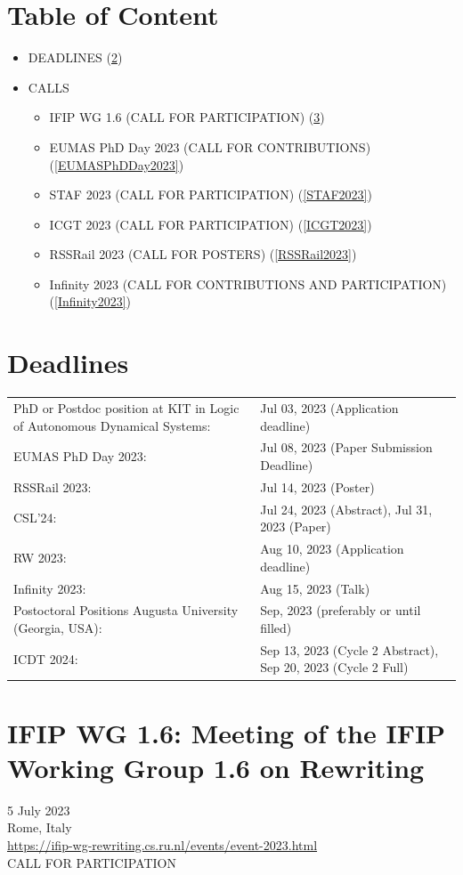 \documentclass[prodmode,acmtecs]{acmsmall} %
\begin{document}
\section{Table of Content}\begin{itemize}\item DEADLINES (\cref{deadlines}) 
 
\item CALLS 
 
\begin{itemize}\item IFIP WG 1.6 (CALL FOR PARTICIPATION) (\cref{IFIPWG16})
\item EUMAS PhD Day 2023 (CALL FOR CONTRIBUTIONS) (\cref{EUMASPhDDay2023})
\item STAF 2023 (CALL FOR PARTICIPATION) (\cref{STAF2023})
\item ICGT 2023 (CALL FOR PARTICIPATION) (\cref{ICGT2023})
\item RSSRail 2023 (CALL FOR POSTERS) (\cref{RSSRail2023})
\item Infinity 2023 (CALL FOR CONTRIBUTIONS AND PARTICIPATION) (\cref{Infinity2023})
\end{itemize} 
\end{itemize}\section{Deadlines}\label{deadlines}\begin{tabulary}{\linewidth}{LL}PhD or Postdoc position at KIT in Logic of Autonomous Dynamical Systems:  & Jul 03, 2023 (Application deadline) \\
EUMAS PhD Day 2023:  & Jul 08, 2023 (Paper Submission Deadline) \\
RSSRail 2023:  & Jul 14, 2023 (Poster) \\
CSL'24:  & Jul 24, 2023 (Abstract), Jul 31, 2023 (Paper) \\
RW 2023:  & Aug 10, 2023 (Application deadline) \\
Infinity 2023:  & Aug 15, 2023 (Talk) \\
Postoctoral Positions Augusta University (Georgia, USA):  & Sep, 2023 (preferably or until filled) \\
ICDT 2024:  & Sep 13, 2023 (Cycle 2 Abstract), Sep 20, 2023 (Cycle 2 Full) \\
\end{tabulary}
\section{IFIP WG 1.6: Meeting of the IFIP Working Group 1.6 on Rewriting}\label{IFIPWG16}  5 July 2023\\ 
  Rome, Italy\\ 
  \href{https://ifip-wg-rewriting.cs.ru.nl/events/event-2023.html}{https://ifip-wg-rewriting.cs.ru.nl/events/event-2023.html}\\ 
CALL FOR PARTICIPATION 
\end{document}
